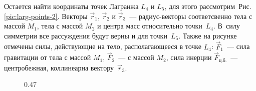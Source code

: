 Остается найти координаты точек Лагранжа $L_4$ и $L_5$, для этого рассмотрим~Рис.\,\ref{pic:larg-points-2}. Векторы $\vec{r}_1$, $\vec{r}_2$ и $\vec{r}_3$~--- радиус-векторы соответсвенно тела с массой $M_1$, тела с массой $M_2$ и центра масс относительно точки~$L_4$. В~силу симметрии  все рассуждения будут верны и для точки~$L_5$. Также на рисунке отмечены силы, действующие на тело, располагающееся в точке $L_4$: $\vec{F}_1$~--- сила гравитации от тела с массой $M_1$, $\vec{F}_2$~--- с массой $M_2$, сила инерции $\vec{F}_\text{ц.б.}$~--- центробежная, коллинеарна вектору~$\vec{r}_3$.

\begin{figure}[h!]
    \hfill
    \begin{subcaptionblock}{0.47\tw}
        \centering
\end{subcaptionblock}
\end{figure}
